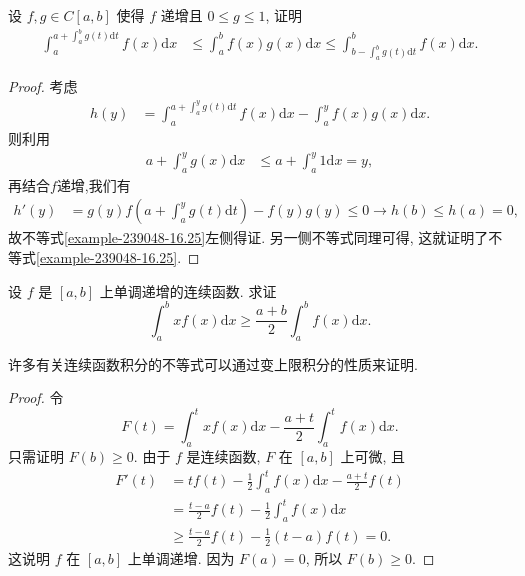 \documentclass[../../main.tex]{subfiles}%
\begin{document}
\begin{example}
设 $f,g \in C[a,b]$ 使得 $f$ 递增且 $0 \leqslant g \leqslant 1$, 证明
\begin{align}\label{example-239048-16.25}
\int_{a}^{a + \int_{a}^{b}g(t)\mathrm{d}t}f(x)\mathrm{d}x &\leqslant \int_{a}^{b}f(x)g(x)\mathrm{d}x \leqslant \int_{b - \int_{a}^{b}g(t)\mathrm{d}t}^{b}f(x)\mathrm{d}x.
\end{align}
\end{example}
\begin{proof}
考虑
\begin{align*}
h(y) &= \int_{a}^{a + \int_{a}^{y}g(t)\mathrm{d}t}f(x)\mathrm{d}x - \int_{a}^{y}f(x)g(x)\mathrm{d}x.
\end{align*}
则利用
\begin{align*}
a + \int_{a}^{y}g(x)\mathrm{d}x &\leqslant a + \int_{a}^{y}1\mathrm{d}x = y,
\end{align*}
再结合$f$递增,我们有
\begin{align*}
h'(y) &= g(y)f\left(a + \int_{a}^{y}g(t)\mathrm{d}t\right) - f(y)g(y) \leqslant 0 \to h(b) \leqslant h(a) = 0,
\end{align*}
故不等式\eqref{example-239048-16.25}左侧得证. 另一侧不等式同理可得, 这就证明了不等式\eqref{example-239048-16.25}. 
\end{proof}

\begin{proposition}
设 $f$ 是 $[a,b]$ 上单调递增的连续函数. 求证
$$\int_a^b xf(x)\mathrm{d}x\geqslant \frac{a+b}{2}\int_a^b f(x)\mathrm{d}x.$$
\end{proposition}
\begin{note}
许多有关连续函数积分的不等式可以通过变上限积分的性质来证明.
\end{note}
\begin{proof}
令
$$F(t)=\int_a^t xf(x)\mathrm{d}x-\frac{a+t}{2}\int_a^t f(x)\mathrm{d}x.$$
只需证明 $F(b)\geqslant 0$. 由于 $f$ 是连续函数, $F$ 在 $[a,b]$ 上可微, 且
$$
\begin{aligned}
F'(t) &= tf(t)-\frac{1}{2}\int_a^t f(x)\mathrm{d}x-\frac{a+t}{2}f(t) \\
&= \frac{t-a}{2}f(t)-\frac{1}{2}\int_a^t f(x)\mathrm{d}x \\
&\geqslant  \frac{t-a}{2}f(t)-\frac{1}{2}(t-a)f(t)=0.
\end{aligned}
$$
这说明 $f$ 在 $[a,b]$ 上单调递增. 因为 $F(a)=0$, 所以 $F(b)\geqslant 0$.
\end{proof}
\end{document}
